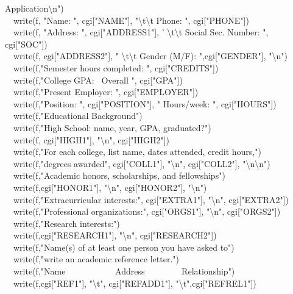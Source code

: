 {Application{\textbackslash}n") \\
\ \ write(f, "Name: ",
cgi["NAME"],
"{\textbackslash}t{\textbackslash}t Phone: ", cgi["PHONE"]) \\
\ \ write(f, "Address: ", cgi["ADDRESS1"], '
{\textbackslash}t{\textbackslash}t Social Sec. Number: ", cgi["SOC"]) \\
\ \ write(f, cgi["ADDRESS2"],
" {\textbackslash}t{\textbackslash}t Gender (M/F):
",cgi["GENDER"],
"{\textbackslash}n") \\
\ \ write(f,"Semester hours completed: ",
cgi["CREDITS"]) \\
\ \ write(f,"College GPA: \ Overall ",
cgi["GPA"]) \\
\ \ write(f,"Present Employer: ",
cgi["EMPLOYER"]) \\
\ \ write(f,"Position: ", cgi["POSITION"], " Hours/week: ", cgi["HOURS"]) \\
\ \ write(f,"Educational Background") \\
\ \ write(f,"High School: name, year, GPA,
		graduated?") \\
\ \ write(f, cgi["HIGH1"],
"{\textbackslash}n",
cgi["HIGH2"]) \\
\ \ write(f,"For each college, list name, dates attended,
credit hours,") \\
\ \ write(f,"degrees awarded", cgi["COLL1"], "{\textbackslash}n", cgi["COLL2"],
"{\textbackslash}n{\textbackslash}n") \\
\ \ write(f,"Academic honors, scholarships, and
fellowships") \\
\ \ write(f,cgi["HONOR1"],
"{\textbackslash}n",
cgi["HONOR2"],
"{\textbackslash}n") \\
\ \ write(f,"Extracurricular interests:", cgi["EXTRA1"],
"{\textbackslash}n",
cgi["EXTRA2"]) \\
\ \ write(f,"Professional organizations:",
cgi["ORGS1"],
"{\textbackslash}n",
cgi["ORGS2"]) \\
\ \ write(f,"Research interests:") \\
\ \ write(f,cgi["RESEARCH1"],
"{\textbackslash}n",
cgi["RESEARCH2"]) \\
\ \ write(f,"Name(s) of at least one person you have asked
to") \\
\ \ write(f,"write an academic reference
letter.") \\
\ \ write(f,"Name \ \ \ \ \ \ \ \ \ \ \ Address
\ \ \ \ \ \ \ \ Relationship") \\
\ \ write(f,cgi["REF1"],
"{\textbackslash}t",
cgi["REFADD1"],
"{\textbackslash}t",cgi["REFREL1"]) \\
}
